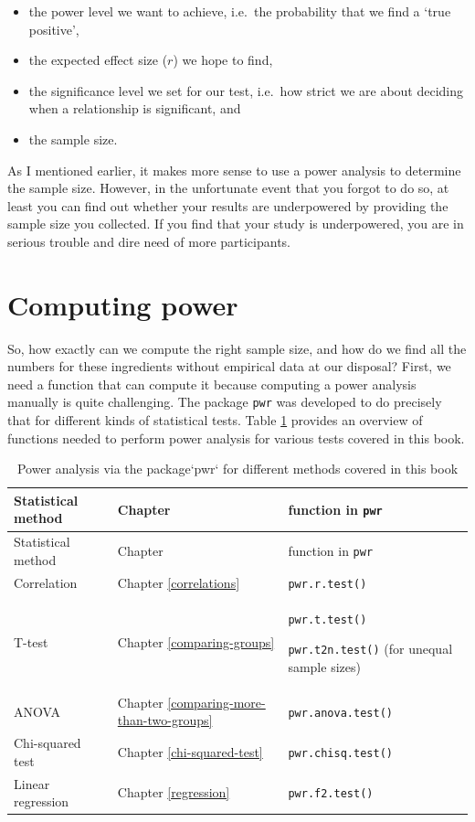 \documentclass[
]{book}
\begin{document}
\begin{itemize}
\item
  the power level we want to achieve, i.e.~the probability that we find a `true positive',
\item
  the expected effect size (\(r\)) we hope to find,
\item
  the significance level we set for our test, i.e.~how strict we are about deciding when a relationship is significant, and
\item
  the sample size.
\end{itemize}

As I mentioned earlier, it makes more sense to use a power analysis to determine the sample size. However, in the unfortunate event that you forgot to do so, at least you can find out whether your results are underpowered by providing the sample size you collected. If you find that your study is underpowered, you are in serious trouble and dire need of more participants.

\hypertarget{computing-power}{%
\section{Computing power}\label{computing-power}}

So, how exactly can we compute the right sample size, and how do we find all the numbers for these ingredients without empirical data at our disposal? First, we need a function that can compute it because computing a power analysis manually is quite challenging. The package \texttt{pwr} was developed to do precisely that for different kinds of statistical tests. Table \ref{tab:power-analysis-pwr} provides an overview of functions needed to perform power analysis for various tests covered in this book.

\begin{longtable}[]{@{}
  >{\raggedright\arraybackslash}p{}
  >{\raggedright\arraybackslash}p{}
  >{\raggedright\arraybackslash}p{}@{}}
\caption{\label{tab:power-analysis-pwr}Power analysis via the package`pwr` for different methods covered in this book}\tabularnewline
\toprule
Statistical method & Chapter & function in \texttt{pwr} \\
\midrule
\endfirsthead
\toprule
Statistical method & Chapter & function in \texttt{pwr} \\
\midrule
\endhead
Correlation & Chapter \ref{correlations} & \texttt{pwr.r.test()} \\
T-test & Chapter \ref{comparing-groups} & \texttt{pwr.t.test()}

\texttt{pwr.t2n.test()} (for unequal sample sizes) \\
ANOVA & Chapter \ref{comparing-more-than-two-groups} & \texttt{pwr.anova.test()} \\
Chi-squared test & Chapter \ref{chi-squared-test} & \texttt{pwr.chisq.test()} \\
Linear regression & Chapter \ref{regression} & \texttt{pwr.f2.test()} \\
\bottomrule
\end{longtable}
\end{document}
